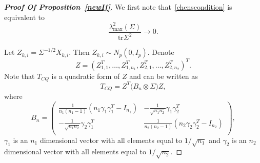 \documentclass[review]{elsarticle}
\theoremstyle{plain}
\theoremstyle{definition}
\theoremstyle{remark}
\begin{document}
\begin{proof}[\textbf{Proof Of Proposition~\ref{newIf}}]
    We first note that~\eqref{chenscondition} is equivalent to
\begin{equation}\label{ChenMaxEigen}
    \frac{\lambda_{\max}^2(\Sigma)}{\mathrm{tr}\Sigma^2}\to 0.
\end{equation}

    Let $Z_{k,i}=\Sigma^{-1/2}X_{k,i}$. Then $Z_{k,i}\sim N_p(0,I_{p})$.
    Denote 
    $$Z={(Z_{1,1}^T,\ldots,Z_{1,n_1}^T,Z_{2,1}^T,\ldots,Z_{2,n_2}^T)}^T.$$
    Note that $T_{CQ}$ is a quadratic form of $Z$ and can be written as
        $$
        T_{CQ}=Z^T \big( B_n\otimes \Sigma \big) Z,
        $$
    where 
    \begin{equation*}
        B_n=\begin{pmatrix}
            \frac{1}{n_1(n_1-1)}(n_1\gamma_1\gamma_1^T-I_{n_1})&
            -\frac{1}{\sqrt{n_1 n_2}}\gamma_1 \gamma_2^T\\
            -\frac{1}{\sqrt{n_1 n_2}}\gamma_2 \gamma_1^T&
            \frac{1}{n_2(n_2-1)}(n_2\gamma_2\gamma_2^T-I_{n_2})\\
        \end{pmatrix},
    \end{equation*}
    $\gamma_1$ is an $n_1$ dimensional vector with all elements equal to $1/\sqrt{n_1}$ and $\gamma_2$ is an $n_2$ dimensional vector with all elements equal to $1/\sqrt{n_2}$.


\end{proof}
\end{document}
